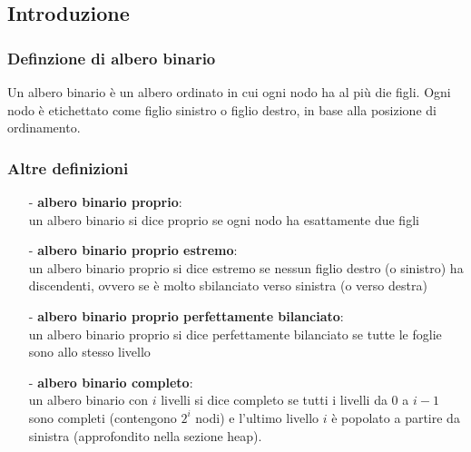 \documentclass[a4paper]{article}
\begin{document}
\subsection{Introduzione}
\subsubsection*{Definzione di albero binario}
Un albero binario è un albero ordinato in cui ogni nodo ha al più die figli. Ogni nodo è etichettato come figlio sinistro o figlio
destro, in base alla posizione di ordinamento.

\subsubsection*{Altre definizioni}
\begin{itemize}[topsep=3pt, itemsep=0pt]
	\item[-] \textbf{albero binario proprio}: \\
	un albero binario si dice proprio se ogni nodo ha esattamente due figli
	\item[-] \textbf{albero binario proprio estremo}: \\
	un albero binario proprio si dice estremo se nessun figlio destro (o sinistro) ha discendenti, ovvero se è molto sbilanciato
	verso sinistra (o verso destra)
	\item[-] \textbf{albero binario proprio perfettamente bilanciato}: \\
	un albero binario proprio si dice perfettamente bilanciato se tutte le foglie sono allo stesso livello
	\item[-] \textbf{albero binario completo}: \\
	un albero binario con \(i\) livelli si dice completo se tutti i livelli da 0 a \(i-1\) sono completi (contengono \(2^i\) nodi)
	e l'ultimo livello \(i\) è popolato a partire da sinistra (approfondito nella sezione heap).
\end{itemize}
\end{document}
